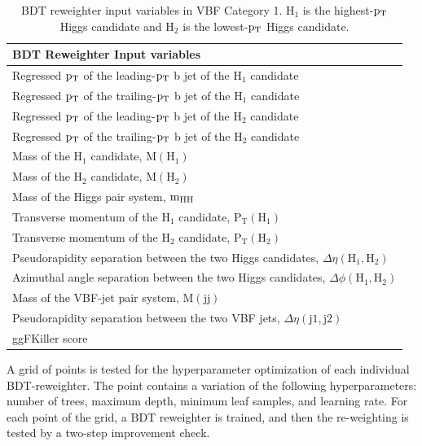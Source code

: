 \begin{table}[htbp!]
\caption[BDT reweighter input variables in VBF Category 1]{\label{tab:vbfvarsbdtr}BDT reweighter input variables in VBF Category 1. $\mathrm{H_{1}}$ is the highest-$\mathrm{p_{T}}$ Higgs candidate and $\mathrm{H_{2}}$ is the lowest-$\mathrm{p_{T}}$ Higgs candidate.}
\centering
\begin{tabularx}{\textwidth}{X}
    \hline
    BDT Reweighter Input variables                          \\    
    \hline
    Regressed $\mathrm{p_{T}}$ of the leading-$\mathrm{p_{T}}$ b jet of the $\mathrm{H_{1}}$ candidate  \\
    Regressed $\mathrm{p_{T}}$ of the trailing-$\mathrm{p_{T}}$ b jet of the $\mathrm{H_{1}}$ candidate \\
    Regressed $\mathrm{p_{T}}$ of the leading-$\mathrm{p_{T}}$ b jet of the $\mathrm{H_{2}}$ candidate  \\
    Regressed $\mathrm{p_{T}}$ of the trailing-$\mathrm{p_{T}}$ b jet of the $\mathrm{H_{2}}$ candidate \\
    Mass of the $\mathrm{H_{1}}$ candidate, $\mathrm{M(H_{1})}$ \\
    Mass of the $\mathrm{H_{2}}$ candidate, $\mathrm{M(H_{2})}$  \\
    Mass of the Higgs pair system, $\mathrm{m_{HH}}$                   \\
    Transverse momentum of the $\mathrm{H_{1}}$ candidate, $\mathrm{P_{T}(H_{1})}$               \\
    Transverse momentum of the $\mathrm{H_{2}}$ candidate, $\mathrm{P_{T}(H_{2})}$               \\
    Pseudorapidity separation between the two Higgs candidates, $\Delta\eta\mathrm{(H_1,H_2)}$   \\
    Azimuthal angle separation between the two Higgs candidates, $\Delta\phi\mathrm{(H_1,H_2)}$  \\
    Mass of the VBF-jet pair system, $\mathrm{M(jj)}$                                            \\
    Pseudorapidity separation between the two VBF jets, $\Delta\eta(\mathrm{j1,j2})$             \\
    ggFKiller score                                                                              \\
    \hline
\end{tabularx}
\end{table}

A grid of points is tested for the hyperparameter optimization of each individual BDT-reweighter. The point contains a variation of the following hyperparameters: number of trees, maximum depth, minimum leaf samples, and learning rate. For each point of the grid, a BDT reweighter is trained, and then the re-weighting is tested by a two-step improvement check. 

